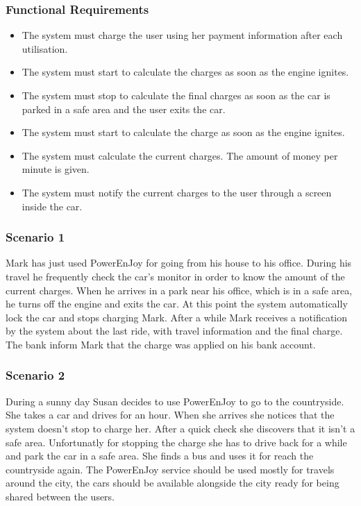 \subsubsection{Functional Requirements}
\begin{itemize}
  \item The system must charge the user using her payment information after each utilisation.
  \item The system must start to calculate the charges as soon as the engine ignites.
  \item The system must stop to calculate the final charges as soon as the car is parked in a safe area and the user exits the car.%
  \item The system must start to calculate the charge as soon as the engine ignites.
  \item The system must calculate the current charges. The amount of money per minute is given.
  \item The system must notify the current charges to the user through a screen inside the car.
\end{itemize}

\subsubsection{Scenario 1}
Mark has just used PowerEnJoy for going from his house to his office. During his travel he frequently check the car's monitor in order to know the amount of the current charges. When he arrives in a park near his office, which is in a safe area, he turns off the engine and exits the car. At this point the system automatically lock the car and stops charging Mark. After a while Mark receives a notification by the system about the last ride, with travel information and the final charge. The bank inform Mark that the charge was applied on his bank account. 


\subsubsection{Scenario 2}
During a sunny day Susan decides to use PowerEnJoy to go to the countryside. She takes a car and drives for an hour. When she arrives she notices that the system doesn't stop to charge her. After a quick check she discovers that it isn't a safe area. Unfortunatly for stopping the charge she has to drive back for a while and park the car in a safe area. She finds a bus and uses it for reach the countryside again. The PowerEnJoy service should be used mostly for travels around the city, the cars should be available alongside the city ready for being shared between the users. 


